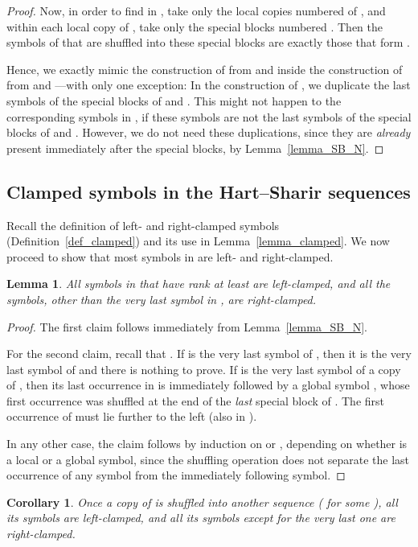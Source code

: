 \documentclass[11pt]{article}
\newtheorem{lemma}[theorem]{Lemma}
\newtheorem{corollary}[theorem]{Corollary}
\theoremstyle{definition}
\theoremstyle{remark}
\begin{document}
\begin{proof}
Now, in order to find  in , take only the local copies numbered  of , and within each local copy of , take only the special blocks numbered . Then the symbols of  that are shuffled into these special blocks are exactly those that form .

Hence, we exactly mimic the construction of  from  and  inside the construction of  from  and ---with only one exception: In the construction of , we duplicate the last symbols of the special blocks of  and . This might not happen to the corresponding symbols in , if these symbols are not the last symbols of the special blocks of  and . However, we do not need these duplications, since they are \emph{already} present immediately after the special blocks, by Lemma~\ref{lemma_SB_N}.
\end{proof}

\subsection{Clamped symbols in the Hart--Sharir sequences}

Recall the definition of left- and right-clamped symbols (Definition~\ref{def_clamped}) and its use in Lemma~\ref{lemma_clamped}. We now proceed to show that most symbols in  are left- and right-clamped.

\begin{lemma}\label{lem_leader}
All symbols in  that have rank at least  are left-clamped, and all the symbols, other than the very last symbol in , are right-clamped.
\end{lemma}

\begin{proof}
The first claim follows immediately from Lemma~\ref{lemma_SB_N}.

For the second claim, recall that . If  is the very last symbol of , then it is the very last symbol of  and there is nothing to prove. If  is the very last symbol of a copy  of , then its last occurrence in  is immediately followed by a global symbol , whose first occurrence was shuffled at the end of the \emph{last} special block of . The first occurrence of  must lie further to the left (also in ).

In any other case, the claim follows by induction on  or , depending on whether  is a local or a global symbol, since the shuffling operation does not separate the last occurrence of any symbol from the immediately following symbol.
\end{proof}

\begin{corollary}\label{cor_global_clamped}
Once a copy of  is shuffled into another sequence ( for some ), all its symbols are left-clamped, and all its symbols except for the very last one are right-clamped.
\end{corollary}
\end{document}
